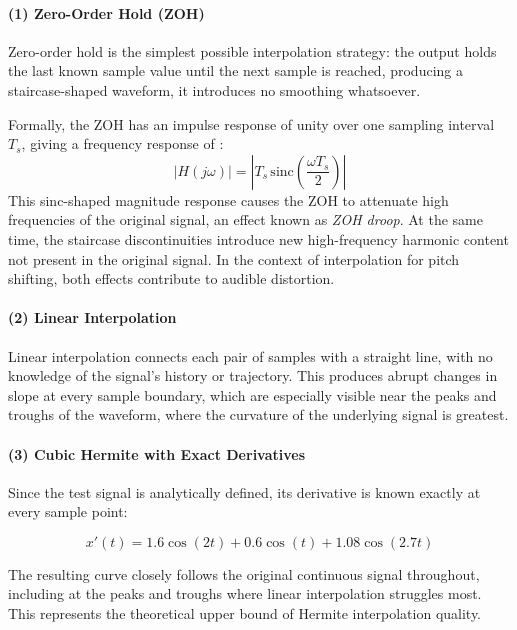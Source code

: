 \paragraph{(1) Zero-Order Hold (ZOH)}
\label{sec:zoh}
Zero-order hold is the simplest possible interpolation strategy: the output holds the 
last known sample value until the next sample is reached, producing a staircase-shaped 
waveform, it introduces no smoothing whatsoever.

Formally, the ZOH has an impulse response of unity over one sampling interval $T_s$, 
giving a frequency response of \cite[pp~107-109]{moirRudimentsSignalProcessing2022}:
\begin{equation}
|H(j\omega)| = \left| T_s \, \mathrm{sinc}\!\left(\frac{\omega T_s}{2}\right) \right|
\end{equation}
This sinc-shaped magnitude response causes the ZOH to attenuate high frequencies of the original signal, an effect known as \textit{ZOH droop}. 
At the same time, the staircase discontinuities introduce new high-frequency harmonic content not present in the original signal. In the context of interpolation for pitch shifting, both effects contribute to audible distortion.

\paragraph{(2) Linear Interpolation}

Linear interpolation connects each pair of samples with a straight line, with no knowledge of the signal's history or trajectory. 
This produces abrupt changes in slope at every sample boundary, which are especially visible near the peaks and troughs of the waveform, where the curvature of the underlying signal is greatest.

\paragraph{(3) Cubic Hermite with Exact Derivatives}

Since the test signal is analytically defined, its derivative is known exactly at every sample point:

\begin{equation}
	x'(t) = 1.6\cos(2t) + 0.6\cos(t) + 1.08\cos(2.7t)
\end{equation}

The resulting curve closely follows the original continuous signal throughout, including at the peaks and troughs where linear interpolation struggles most. This represents the theoretical upper bound of Hermite interpolation quality.

